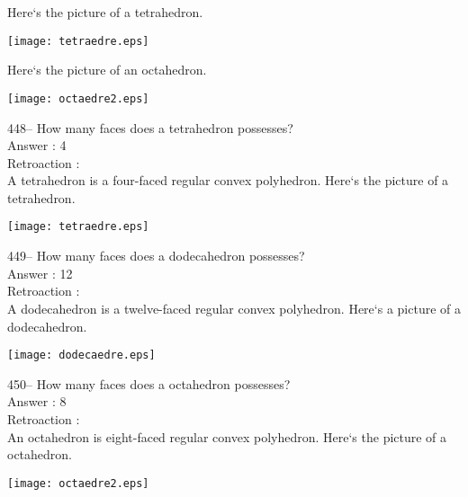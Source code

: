 ﻿\documentclass[letterpaper, 12pt]{article}
\begin{document}
Here`s the picture of a tetrahedron.\\
    \begin{center}
    \texttt{[image: tetraedre.eps]}
    \end{center}
Here`s the picture of an octahedron.\\
    \begin{center}
    \texttt{[image: octaedre2.eps]}
    \end{center}



448--  How many faces does a tetrahedron possesses?\\

Answer : 4\\

Retroaction : \\
A tetrahedron is a four-faced regular convex polyhedron.
Here`s the picture of a tetrahedron.\\
    \begin{center}
    \texttt{[image: tetraedre.eps]}
    \end{center}

449--  How many faces does a dodecahedron possesses?\\

Answer : 12\\

Retroaction : \\
A dodecahedron is a twelve-faced regular convex polyhedron. Here`s a picture of a dodecahedron.\\
    \begin{center}
    \texttt{[image: dodecaedre.eps]}
    \end{center}


450--  How many faces does a octahedron possesses?\\

Answer : 8\\

Retroaction : \\
An octahedron is eight-faced regular convex polyhedron. Here`s the picture of a octahedron.\\
    \begin{center}
    \texttt{[image: octaedre2.eps]}
    \end{center}
\end{document}
